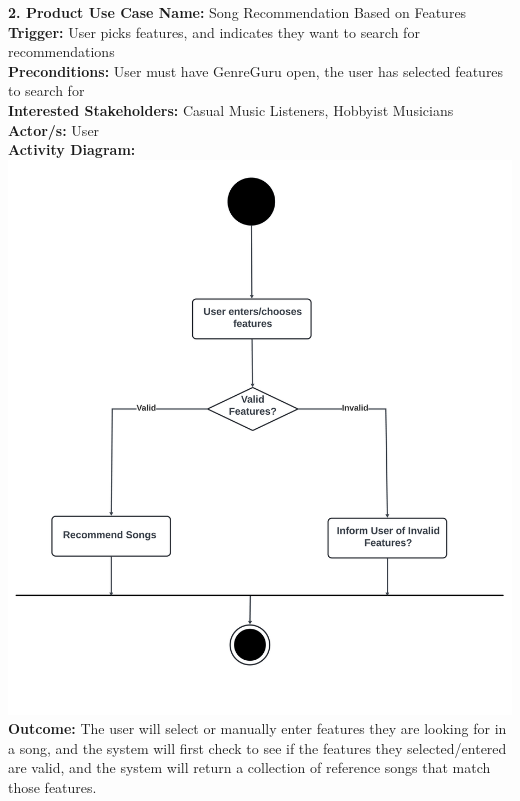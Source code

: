 \documentclass[12pt]{article}
\begin{document}
\noindent \textbf{2. Product Use Case Name:} Song Recommendation Based on Features \\
\textbf{Trigger:} User picks features, and indicates they want to search for recommendations \\
\textbf{Preconditions:} User must have GenreGuru open, the user has selected features to search for \\
\textbf{Interested Stakeholders:} Casual Music Listeners, Hobbyist Musicians \\
\textbf{Actor/s:} User \\
\textbf{Activity Diagram:} \\
\includegraphics[width=\textwidth]{recommendation_feature.png} \\
\textbf{Outcome:} The user will select or manually enter features they are looking for in a song, and the system will first check to see if the features they selected/entered are valid, and the system will return a collection of reference songs that match those features.

\vspace{1cm}
\end{document}
